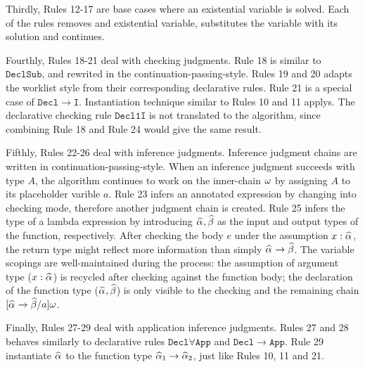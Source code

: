 Thirdly, Rules 12-17 are base cases where an existential variable is solved.
Each of the rules removes and existential variable, substitutes the variable with its solution and continues.

Fourthly, Rules 18-21 deal with checking judgments.
Rule 18 is similar to $\mathtt{DeclSub}$, and rewrited in the continuation-passing-style.
Rules 19 and 20 adapts the worklist style from their corresponding declarative rules.
Rule 21 is a special case of $\mathtt{Decl\to I}$.
Instantiation technique similar to Rules 10 and 11 applys.
The declarative checking rule $\mathtt{Decl1I}$ is not translated to the algorithm,
since combining Rule 18 and Rule 24 would give the same result.

Fifthly, Rules 22-26 deal with inference judgments.
Inference judgment chains are written in continuation-passing-style.
When an inference judgment succeeds with type $A$,
the algorithm continues to work on the inner-chain $\omega$ by assigning $A$ to its placeholder varible $a$.
Rule 23 infers an annotated expression by changing into checking mode,
therefore another judgment chain is created.
Rule 25 infers the type of a lambda expression by introducing $\al, \bt$
as the input and output types of the function, respectively.
After checking the body $e$ under the assumption $x:\al$,
the return type might reflect more information than simply $\al \to \bt$.
The variable scopings are well-maintained during the process:
the assumption of argument type ($x:\al$) is recycled after checking against the function body;
the declaration of the function type ($\al,\bt$) is only visible to
the checking and the remaining chain $[\al\to\bt/a]\jg$.

Finally, Rules 27-29 deal with application inference judgments.
Rules 27 and 28 behaves similarly to declarative rules $\mathtt{Decl\forall App}$ and $\mathtt{Decl\to App}$.
Rule 29 instantiate $\al$ to the function type $\al[1] \to \al[2]$, just like Rules 10, 11 and 21.
